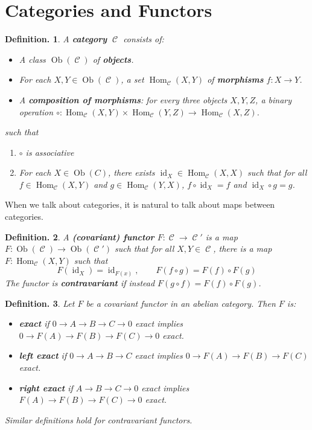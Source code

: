 \documentclass[11pt, a4paper]{memoir}
\theoremstyle{change}
\theoremstyle{plain}
\theoremstyle{nonumberplain}
\newtheorem{definition}{Definition.}
\DeclareMathOperator{\Hom}{Hom}
\DeclareMathOperator{\id}{id}
\DeclareMathOperator{\Ct}{\mathcal{C}}
\DeclareMathOperator{\Ob}{Ob}
\numberwithin{equation}{section}
\begin{document}
\section{Categories and Functors}
\begin{definition}
    A \textbf{category} $\Ct$ consists of:
    \begin{itemize}[nolistsep]
        \item A class $\Ob(\Ct)$ of \textbf{objects}.
        \item For each $X,Y\in\Ob(\Ct)$, a set $\Hom_{\Ct}(X,Y)$ of \textbf{morphisms} $f:X\to Y$.
        \item A \textbf{composition of morphisms}: for every three objects $X,Y,Z$, a binary operation $\circ:\Hom_{\Ct}(X,Y)\times\Hom_{\Ct}(Y,Z)\to\Hom_{\Ct}(X,Z)$.
    \end{itemize}
    such that
    \begin{enumerate}[nolistsep]
        \item $\circ$ is associative
        \item For each $X\in\Ob(C)$, there exists $\id_X\in\Hom_{\Ct}(X,X)$ such that for all $f\in\Hom_{\Ct}(X,Y)$ and $g\in\Hom_{\Ct}(Y,X)$, $f\circ\id_X=f$ and $\id_X\circ g=g$.
    \end{enumerate}
\end{definition}
When we talk about categories, it is natural to talk about maps between categories.
\begin{definition}
    A \textbf{(covariant) functor} $F:\Ct\to \Ct'$ is a map $F:\Ob(\Ct)\to\Ob(\Ct')$ such that for all $X,Y\in \Ct$, there is a map $F:\Hom_{\Ct}(X,Y)$ such that
    \begin{equation*}
        F(\id_X)=\id_{F(x)},\qquad F(f\circ g)=F(f)\circ F(g)
    \end{equation*}
    The functor is \textbf{contravariant} if instead $F(g\circ f)=F(f)\circ F(g)$.
\end{definition}
\begin{definition}
    Let $F$ be a covariant functor in an abelian category.
    Then $F$ is:
    \begin{itemize}[nolistsep]
        \item \textbf{exact} if $0\to A\to B\to C\to 0$ exact implies $0\to F(A)\to F(B)\to F(C)\to 0$ exact.
        \item \textbf{left exact} if $0\to A\to B\to C$ exact implies $0\to F(A)\to F(B)\to F(C)$ exact.
        \item \textbf{right exact} if $A\to B\to C\to 0$ exact implies $F(A)\to F(B)\to F(C)\to 0$ exact.
    \end{itemize}
    Similar definitions hold for contravariant functors.
\end{definition}
\end{document}
